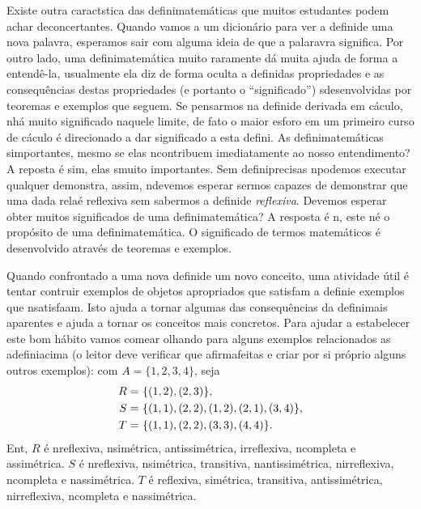 Existe outra caract\ih stica das defini\coes matem\'aticas que muitos estudantes podem achar deconcertantes. Quando vamos a um dicion\'ario para ver a defini\cao de uma nova palavra, esperamos sair com alguma ideia de que a palaravra significa. Por outro lado, uma defini\cao matem\'atica muito raramente d\'a muita ajuda de forma a entend\^e-la, usualmente ela diz de forma oculta a defini\cao das propriedades e as consequ\^encias destas propriedades (e portanto o ``significado'') s\ao desenvolvidas por teoremas e exemplos que seguem. Se pensarmos na defini\cao de derivada em c\'aculo, n\ao h\'a muito significado naquele limite, de fato o maior esfor\cc o em um primeiro curso de c\'aculo \'e direcionado a dar significado a esta defini\caoi. As defini\coes matem\'aticas s\ao importantes, mesmo se elas n\ao contribuem imediatamente ao nosso entendimento? A reposta \'e sim, elas s\ao muito importantes. Sem defini\coes precisas n\ao podemos executar qualquer demonstra\caoi, assim, n\ao devemos esperar sermos capazes de demonstrar que uma dada rela\cao \'e reflexiva sem sabermos a defini\cao de {\it reflexiva}. Devemos esperar obter muitos significados de uma defini\cao matem\'atica? A resposta \'e n\aoi, este n\ao \'e o prop\'osito de uma defini\cao matem\'atica. O significado de termos matem\'aticos \'e desenvolvido atrav\'es de teoremas e exemplos.  

Quando confrontado a uma nova defini\cao de um novo conceito, uma atividade \'util \'e tentar contruir exemplos de objetos apropriados que satisf\cc am a defini\cao e exemplos que n\ao satisfa\cc am. Isto ajuda a tornar algumas das consequ\^encias da defini\cao mais aparentes e ajuda a tornar os conceitos mais concretos. Para ajudar a estabelecer este bom h\'abito vamos come\cc ar olhando para alguns exemplos relacionados as adefini\coes acima (o leitor deve verificar que afirma\coes feitas e criar por si pr\'oprio alguns outros exemplos): com $A=\{1,2,3,4\}$, seja
\begin{equation*}
 \begin{aligned}
R=&\textrm{ }\{(1,2),(2,3)\},\\
S=&\textrm{ }\{(1,1),(2,2),(1,2),(2,1),(3,4)\},\\
T=&\textrm{ }\{(1,1),(2,2),(3,3),(4,4)\}.
 \end{aligned}
\end{equation*} 
Ent\aoi, $R$ \'e n\ao reflexiva, n\ao sim\'etrica, antissim\'etrica, irreflexiva, n\ao completa e assim\'etrica. $S$ \'e n\ao reflexiva, n\ao sim\'etrica, transitiva, n\ao antissim\'etrica, n\ao irreflexiva, n\ao completa e n\ao assim\'etrica. $T$ \'e reflexiva, sim\'etrica, transitiva, antissim\'etrica, n\ao irreflexiva, n\ao completa e n\ao assim\'etrica.

